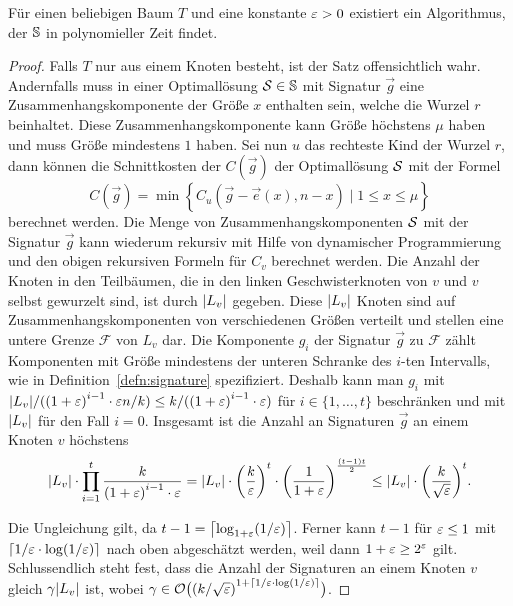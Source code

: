 \begin{thm}\label{thm:cutphase}
    Für einen beliebigen Baum $T$ und eine konstante $\eps > 0$ existiert ein Algorithmus, der $\bbS$ in polynomieller Zeit findet.
\end{thm}
\begin{proof}
    Falls $T$ nur aus einem Knoten besteht, ist der Satz offensichtlich wahr.
    Andernfalls muss in einer Optimallösung $\calS \in \bbS$ mit Signatur $\vec{g}$ eine Zusammenhangskomponente der Größe $x$ enthalten sein, welche die Wurzel $r$ beinhaltet.
    Diese Zusammenhangskomponente kann Größe höchstens $\mu$ haben und muss Größe mindestens $1$ haben.
    Sei nun $u$ das rechteste Kind der Wurzel $r$, dann können die Schnittkosten der $C(\vec{g})$ der Optimallösung $\calS$ mit der Formel
    \begin{equation}\label{eq:root}
        C(\vec{g}) = \min \left\{ C_u(\vec{g} - \vec{e}(x), n - x) \mid 1 \leq x \leq \mu \right\}
    \end{equation}
    berechnet werden.
    Die Menge von Zusammenhangskomponenten $\calS$ mit der Signatur $\vec{g}$ kann wiederum rekursiv mit Hilfe von dynamischer Programmierung und den obigen rekursiven Formeln für $C_v$ berechnet werden.
    Die Anzahl der Knoten in den Teilbäumen, die in den linken Geschwisterknoten von $v$ und $v$ selbst gewurzelt sind, ist durch $\card{L_v}$ gegeben.
    Diese $\card{L_v}$ Knoten sind auf Zusammenhangskomponenten von verschiedenen Größen verteilt und stellen eine untere Grenze $\mathcal{F}$ von $L_v$ dar.
    Die Komponente $g_i$ der Signatur $\vec{g}$ zu $\mathcal{F}$ zählt Komponenten mit Größe mindestens der unteren Schranke des $i$-ten Intervalls, wie in Definition~\ref{defn:signature} spezifiziert.
    Deshalb kann man $g_i$ mit $\card{L_v}/({(1 + \eps)}^{i - 1} \cdot \eps n/k) \leq k/({(1 + \eps)}^{i - 1} \cdot \eps)$ für $i \in \{1, \ldots, t\}$ beschränken und mit $\card{L_v}$ für den Fall $i = 0$.
    Insgesamt ist die Anzahl an Signaturen $\vec{g}$ an einem Knoten $v$ höchstens
    \begin{equation}\label{eq:sigcount}
        \card{L_v} \cdot \prod^t_{i=1} \frac{k}{{(1 + \eps)}^{i - 1} \cdot \eps} 
        = \card{L_v} \cdot {\left( \frac{k}{\eps} \right)}^t \cdot {\left( \frac{1}{1 + \eps} \right)}^{\frac{(t-1)t}{2}} 
        \leq \card{L_v} \cdot {\left( \frac{k}{\sqrt{\eps}} \right)}^t.
    \end{equation}

    Die Ungleichung gilt, da $t - 1 = \ceil*{\log_{1 + \eps}(1/\eps)}$. 
    Ferner kann $t - 1$ für $\eps \leq 1$ mit $\ceil*{1/\eps \cdot \log(1/\eps)}$ nach oben abgeschätzt werden, weil dann $1 + \eps \geq 2^\eps$ gilt.
    Schlussendlich steht fest, dass die Anzahl der Signaturen an einem Knoten $v$ gleich $\gamma \card{L_v}$ ist, wobei $\gamma \in \bigO \big({(k/\sqrt{\eps})}^{1 + \ceil{1/\eps \cdot \log(1/\eps)}}\big)$.


\end{proof}

